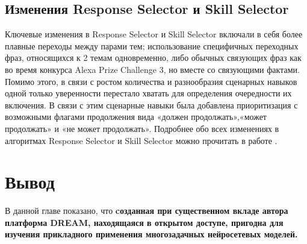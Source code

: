 \subsection{Изменения Response Selector и Skill Selector}

Ключевые изменения в Response Selector и Skill Selector включали в себя более плавные переходы между парами тем; использование специфичных переходных фраз, относящихся к 2 темам одновременно, либо обычных связующих фраз как во время конкурса Alexa Prize Challenge 3, но вместе со связующими фактами. 
Помимо этого, в связи с ростом количества и разнообразия сценарных навыков одной только уверенности перестало хватать для определения очередности их включения. В связи с этим сценарные навыки была добавлена приоритизация с возможными флагами продолжения вида «должен продолжать»,«может продолжать» и «не может продолжать». 
Подробнее обо всех изменениях в алгоритмах Response Selector и Skill Selector можно прочитать в работе \cite{dream2}.

\section{Вывод}

В данной главе показано, что \textbf{cозданная при существенном вкладе автора платформа DREAM, находящаяся в открытом доступе, пригодна для изучения прикладного применения многозадачных нейросетевых моделей.}